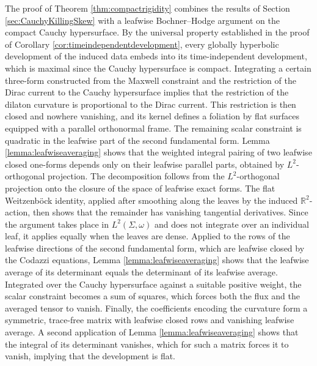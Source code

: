 \documentclass[10pt,reqno,a4paper]{amsart}
\theoremstyle{plain}
\theoremstyle{definition}
\theoremstyle{remark}
\theoremstyle{remark}
\renewcommand{\(}{ (}
\renewcommand{\)}{ )}
\begin{document}
The proof of Theorem \ref{thm:compactrigidity} combines the results of Section \ref{sec:CauchyKillingSkew} with a leafwise Bochner--Hodge argument on the compact Cauchy hypersurface. By the universal property established in the proof of Corollary \ref{cor:timeindependentdevelopment}, every globally hyperbolic development of the induced data embeds into its time-independent development, which is maximal since the Cauchy hypersurface is compact. Integrating a certain three-form constructed from the Maxwell constraint and the restriction of the Dirac current to the Cauchy hypersurface implies that the restriction of the dilaton curvature is proportional to the Dirac current. This restriction is then closed and nowhere vanishing, and its kernel defines a foliation by flat surfaces equipped with a parallel orthonormal frame. The remaining scalar constraint is quadratic in the leafwise part of the second fundamental form. Lemma \ref{lemma:leafwiseaveraging} shows that the weighted integral pairing of two leafwise closed one-forms depends only on their leafwise parallel parts, obtained by $L^2$-orthogonal projection. The decomposition follows from the $L^2$-orthogonal projection onto the closure of the space of leafwise exact forms. The flat Weitzenböck identity, applied after smoothing along the leaves by the induced $\mathbb{R}^2$-action, then shows that the remainder has vanishing tangential derivatives. Since the argument takes place in $L^2(\Sigma,\omega)$ and does not integrate over an individual leaf, it applies equally when the leaves are dense. Applied to the rows of the leafwise directions of the second fundamental form, which are leafwise closed by the Codazzi equations, Lemma \ref{lemma:leafwiseaveraging} shows that the leafwise average of its determinant equals the determinant of its leafwise average. Integrated over the Cauchy hypersurface against a suitable positive weight, the scalar constraint becomes a sum of squares, which forces both the flux and the averaged tensor to vanish. Finally, the coefficients encoding the curvature form a symmetric, trace-free matrix with leafwise closed rows and vanishing leafwise average. A second application of Lemma \ref{lemma:leafwiseaveraging} shows that the integral of its determinant vanishes, which for such a matrix forces it to vanish, implying that the development is flat.
\end{document}
